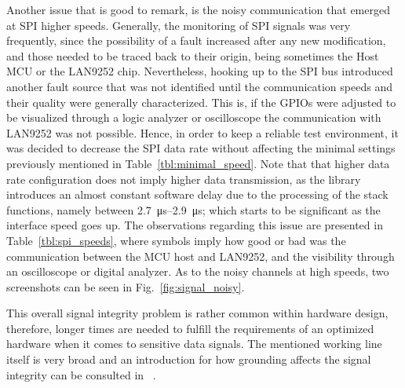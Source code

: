 Another issue that is good to remark, is the noisy communication that emerged at SPI higher speeds. Generally, the monitoring of SPI
signals was very frequently, since the possibility of a fault increased after any new modification, and those needed to be 
traced back to their origin, being sometimes the Host MCU or the LAN9252 chip. Nevertheless, hooking up to the SPI bus introduced another
fault source that was not identified until the communication speeds and their quality were generally characterized. This is, if the GPIOs were 
adjusted to be visualized through a logic analyzer or oscilloscope the communication with LAN9252 was not possible. Hence, 
in order to keep a reliable test environment, it was decided to decrease the SPI data rate without affecting the minimal 
settings 
previously mentioned in Table~\ref{tbl:minimal_speed}. Note that that higher data rate configuration does not imply higher data transmission, as 
the library introduces an almost constant software delay due to the processing of the stack functions, 
namely between \SIrange{2.7}{2.9}{\micro\second}; which starts to be significant as the interface speed goes up. 
The observations regarding this issue are presented in Table~\ref{tbl:spi_speeds}, where symbols imply how good or bad was the communication
between the MCU host and LAN9252, and the visibility through an oscilloscope or digital analyzer. As to the noisy channels at 
high speeds, two screenshots can be seen in Fig.~\ref{fig:signal_noisy}. 

This overall signal integrity problem is rather common within hardware design, therefore, longer times are needed to 
fulfill the requirements
of an optimized hardware when it comes to sensitive data signals. The mentioned working line itself is very broad and 
an introduction for how grounding affects the signal integrity can be consulted in ~\cite{pcb_design_grounding}.%


